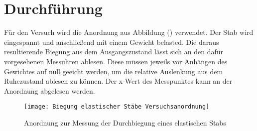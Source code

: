 \section{Durchführung}
Für den Versuch wird die Anordnung aus Abbildung () verwendet. Der Stab wird eingespannt und anschließend mit einem Gewicht belasted. Die daraus 
resultierende Biegung aus dem Ausgangszustand lässt sich an den dafür vorgesehenen Messuhren ablesen. Diese müssen jeweils vor Anhängen des Gewichtes 
auf null geeicht werden, um die relative Auslenkung aus dem Ruhezustand ablesen zu können. Der x-Wert des Messpunktes kann an der Anordnung abgelesen werden. \\
\begin{figure}
\centering
\texttt{[image: Biegung elastischer Stäbe Versuchsanordnung]}
\caption{Anordnung zur Messung der Durchbiegung eines elastischen Stabs}
\label{fig:Aufbau}
\end{figure}
